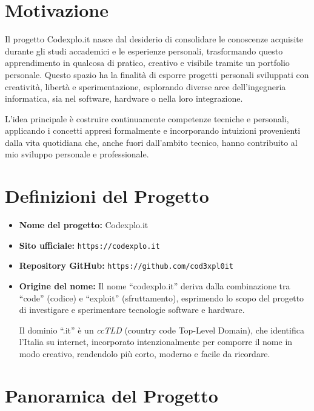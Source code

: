 \documentclass[10pt, a4paper, oneside]{article}
\begin{document}
\section{Motivazione}

Il progetto Codexplo.it nasce dal desiderio di consolidare le conoscenze acquisite durante gli studi accademici e le esperienze personali, trasformando questo apprendimento in qualcosa di pratico, creativo e visibile tramite un portfolio personale. Questo spazio ha la finalità di esporre progetti personali sviluppati con creatività, libertà e sperimentazione, esplorando diverse aree dell’ingegneria informatica, sia nel software, hardware o nella loro integrazione.\newline

L’idea principale è costruire continuamente competenze tecniche e personali, applicando i concetti appresi formalmente e incorporando intuizioni provenienti dalla vita quotidiana che, anche fuori dall’ambito tecnico, hanno contribuito al mio sviluppo personale e professionale.\newpage

\section{Definizioni del Progetto}

\begin{itemize}
  \item \textbf{Nome del progetto:} Codexplo.it  
  \item \textbf{Sito ufficiale:} \texttt{https://codexplo.it}  
  \item \textbf{Repository GitHub:} \texttt{https://github.com/cod3xpl0it}  
  \item \textbf{Origine del nome:}  
  Il nome “codexplo.it” deriva dalla combinazione tra “code” (codice) e “exploit” (sfruttamento), esprimendo lo scopo del progetto di investigare e sperimentare tecnologie software e hardware.\newline
  
  Il dominio “.it” è un \textit{ccTLD} (country code Top-Level Domain), che identifica l’Italia su internet, incorporato intenzionalmente per comporre il nome in modo creativo, rendendolo più corto, moderno e facile da ricordare.  
\end{itemize}

\section{Panoramica del Progetto}
\end{document}
